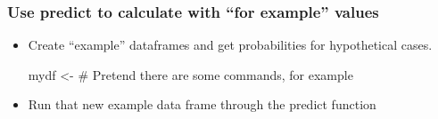 \documentclass[10pt,english]{beamer}
\begin{document}
\begin{frame}[containsverbatim]
  \frametitle{Use predict to calculate with ``for example'' values}
  \begin{itemize}
  \item Create ``example'' dataframes and get probabilities for
    hypothetical cases.

    \begin{Schunk}
    \begin{Sinput}
      mydf <- # Pretend there are some commands, for example
    \end{Sinput}
  \end{Schunk}
\item Run that new example data frame through the predict function



\end{itemize}
\end{frame}





% 



% 


\end{document}
